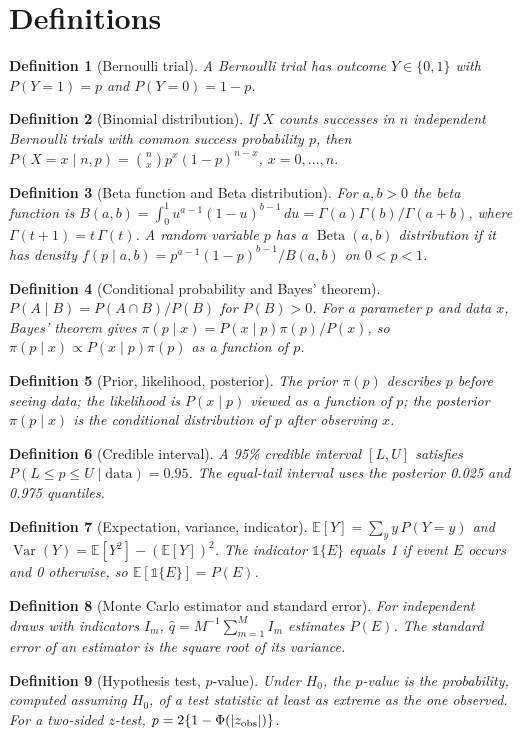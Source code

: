\documentclass[11pt]{article}
\newtheorem{definition}{Definition}
\newcommand{\E}{\mathbb{E}}
\newcommand{\Var}{\operatorname{Var}}
\newcommand{\Beta}{\operatorname{Beta}}
\begin{document}
\section{Definitions}
\begin{definition}[Bernoulli trial]
A Bernoulli trial has outcome $Y\in\{0,1\}$ with $P(Y=1)=p$ and $P(Y=0)=1-p$.
\end{definition}
\begin{definition}[Binomial distribution]
If $X$ counts successes in $n$ independent Bernoulli trials with common success probability $p$, then
$P(X=x\mid n,p)=\binom{n}{x}p^x(1-p)^{n-x}$, $x=0,\dots,n$.
\end{definition}
\begin{definition}[Beta function and Beta distribution]
For $a,b>0$ the beta function is $B(a,b)=\int_0^1u^{a-1}(1-u)^{b-1}\,du=\Gamma(a)\Gamma(b)/\Gamma(a+b)$, where $\Gamma(t+1)=t\,\Gamma(t)$. A random variable $p$ has a $\Beta(a,b)$ distribution if it has density $f(p\mid a,b)=p^{a-1}(1-p)^{b-1}/B(a,b)$ on $0<p<1$.
\end{definition}
\begin{definition}[Conditional probability and Bayes' theorem]
$P(A\mid B)=P(A\cap B)/P(B)$ for $P(B)>0$. For a parameter $p$ and data $x$, Bayes' theorem gives $\pi(p\mid x)=P(x\mid p)\pi(p)/P(x)$, so $\pi(p\mid x)\propto P(x\mid p)\pi(p)$ as a function of $p$.
\end{definition}
\begin{definition}[Prior, likelihood, posterior]
The prior $\pi(p)$ describes $p$ before seeing data; the likelihood is $P(x\mid p)$ viewed as a function of $p$; the posterior $\pi(p\mid x)$ is the conditional distribution of $p$ after observing $x$.
\end{definition}
\begin{definition}[Credible interval]
A 95\% credible interval $[L,U]$ satisfies $P(L\le p\le U\mid\text{data})=0.95$. The equal-tail interval uses the posterior 0.025 and 0.975 quantiles.
\end{definition}
\begin{definition}[Expectation, variance, indicator]
$\E[Y]=\sum_y y\,P(Y=y)$ and $\Var(Y)=\E[Y^2]-(\E[Y])^2$. The indicator $\mathbb 1\{E\}$ equals 1 if event $E$ occurs and 0 otherwise, so $\E[\mathbb 1\{E\}]=P(E)$.
\end{definition}
\begin{definition}[Monte Carlo estimator and standard error]
For independent draws with indicators $I_m$, $\hat q=M^{-1}\sum_{m=1}^MI_m$ estimates $P(E)$. The standard error of an estimator is the square root of its variance.
\end{definition}
\begin{definition}[Hypothesis test, $p$-value]
Under $H_0$, the $p$-value is the probability, computed assuming $H_0$, of a test statistic at least as extreme as the one observed. For a two-sided $z$-test, $p=2\{1-\Phi(|z_{\rm obs}|)\}$.
\end{definition}
\end{document}
